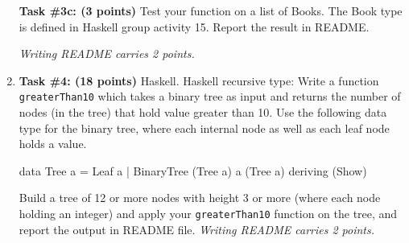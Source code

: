 \documentclass[paper=letter, fontsize=11pt]{scrartcl} %
\begin{document}
\begin{enumerate}
\textbf{Task \#3c: (3 points)} 
Test your function on a list of Books. The Book type is defined in Haskell group activity 15.  
Report the result in README.

\emph{Writing README carries 2 points.}
        \item \textbf{Task \#4: (18 points)} Haskell. Haskell recursive type: 
Write a function \texttt{greaterThan10} which takes a binary tree as input and returns 
the number of nodes (in the tree) that hold value greater than 10. 
Use the following data type for the binary tree, 
where each internal node as well as each leaf node holds a value.

data Tree a = Leaf a | BinaryTree (Tree a) a (Tree a)  deriving (Show)

Build a tree of 12 or more nodes with height 3 or more 
(where each node holding an integer) and apply your \texttt{greaterThan10} 
function on the tree, and report the output in README file. \emph{Writing README carries 2 points.}

    
    \end{enumerate}
\end{document}
